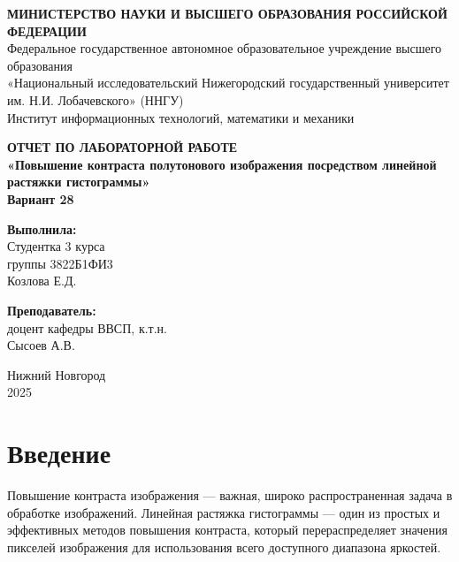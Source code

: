 \documentclass[14pt,a4paper]{extarticle}
\begin{document}
\begin{titlepage}
\begin{center}

\onehalfspacing

\textbf{МИНИСТЕРСТВО НАУКИ И ВЫСШЕГО ОБРАЗОВАНИЯ РОССИЙСКОЙ ФЕДЕРАЦИИ} \\
Федеральное государственное автономное образовательное учреждение высшего образования \\
«Национальный исследовательский Нижегородский государственный университет им. Н.И. Лобачевского» (ННГУ) \\
Институт информационных технологий, математики и механики

\vspace{4cm}

\textbf{ОТЧЕТ ПО ЛАБОРАТОРНОЙ РАБОТЕ} \\
\textbf{«Повышение контраста полутонового изображения посредством линейной растяжки гистограммы»} \\
\textbf{Вариант 28}

\vspace{4cm}

\begin{flushright}
\textbf{Выполнила:} \\
Студентка 3 курса \\
группы 3822Б1ФИ3 \\
Козлова Е.Д.

\vspace{1cm}

\textbf{Преподаватель:} \\
доцент кафедры ВВСП, к.т.н. \\
Сысоев А.В.
\end{flushright}

\vspace{1cm}

\begin{center}
Нижний Новгород\\
2025
\end{center}

\end{center}
\end{titlepage}

\tableofcontents
\newpage

\section{Введение}

Повышение контраста изображения — важная, широко распространенная задача в обработке изображений. Линейная растяжка гистограммы — один из простых и эффективных методов повышения контраста, который перераспределяет значения пикселей изображения для использования всего доступного диапазона яркостей.
\end{document}
